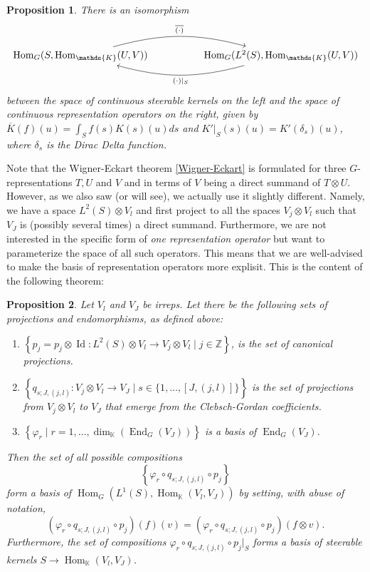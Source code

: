 \documentclass[12pt, a4paper]{article}
\theoremstyle{plain}
\newtheorem{pro}{Proposition}[section]
\theoremstyle{definition}
\theoremstyle{remark}
\newcommand{\Z}{\mathds{Z}}
\newcommand{\K}{\mathds{K}}
\DeclareMathOperator{\End}{End}
\DeclareMathOperator{\Hom}{Hom}
\DeclareMathOperator{\Id}{Id}
\begin{document}
\begin{pro}\label{steerable kernels = representation operators}
There is an isomorphism
\begin{equation*}
\begin{tikzcd}
\Hom_G(S, \Hom_{\K}(U, V)) \ar[rr, bend left = 15, "\overline{(\cdot)}"] & & \Hom_G(L^2(S), \Hom_{\K}(U, V)) \ar[ll, bend left = 15, "(\cdot)|_{S}"]
\end{tikzcd}
\end{equation*}
between the space of continuous steerable kernels on the left and the space of continuous representation operators on the right, given by $\overline{K}(f)(u) = \int_{S}f(s)K(s)(u)ds$ and $K'|_{S}(s)(u) = K'(\delta_s)(u)$, where $\delta_s$ is the Dirac Delta function.
\end{pro}

Note that the Wigner-Eckart theorem \ref{Wigner-Eckart} is formulated for three $G$-representations $T, U$ and $V$ and in terms of $V$ being a direct summand of $T \otimes U$. However, as we also saw (or will see), we actually use it slightly different. Namely, we have a space $L^2(S) \otimes V_l$ and first project to all the spaces $V_j \otimes V_l$ such that $V_J$ is (possibly several times) a direct summand. Furthermore, we are not interested in the specific form of \emph{one representation operator} but want to parameterize the space of all such operators. This means that we are well-advised to make the basis of representation operators more explisit. This is the content of the following theorem:

\begin{pro}\label{representation operators basis}
Let $V_l$ and $V_J$ be irreps. Let there be the following sets of projections and endomorphisms, as defined above:
\begin{enumerate}
\item $\left\lbrace p_j = p_j \otimes \Id: L^2(S) \otimes V_l \to V_j \otimes V_l \mid j \in \Z \right\rbrace$, is the set of canonical projections.
\item $\left\lbrace q_{s; J, (j,l)}: V_j \otimes V_l \to V_J \mid s \in \{1, \dots, [J,(j,l)]\} \right\rbrace$ is the set of projections from $V_j \otimes V_l$ to $V_J$ that emerge from the Clebsch-Gordan coefficients.
\item $\left\lbrace \varphi_r \mid r = 1, \dots, \dim_{\K}\left(\End_{G}\left(V_J\right)\right) \right\rbrace$ is a basis of $\End_G(V_J)$.
\end{enumerate}
Then the set of all possible compositions 
\begin{equation*}
\left\lbrace \varphi_r \circ q_{s; J, (j,l)} \circ p_j \right\rbrace
\end{equation*} 
form a basis of $\Hom_G(L^1(S), \Hom_{\K}(V_l, V_J))$ by setting, with abuse of notation, 
\begin{equation*}
(\varphi_r \circ q_{s; J, (j,l)} \circ p_j)(f)(v) = (\varphi_r \circ q_{s; J, (j,l)} \circ p_j)(f \otimes v).
\end{equation*}
Furthermore, the set of compositions $\varphi_r \circ q_{s; J, (j,l)} \circ p_j|_{S}$ forms a basis of steerable kernels $S \to \Hom_{\K}(V_l, V_J)$.
\end{pro}
\end{document}

